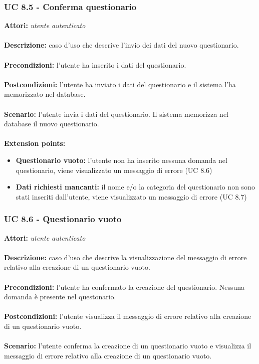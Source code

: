 \documentclass[a4paper,11pt]{article}
\begin{document}
\subsubsection{UC 8.5 - Conferma questionario}

\textbf{Attori:} \textit{utente autenticato}
\\ \\
\textbf{Descrizione:} caso d'uso che descrive l'invio dei dati del nuovo questionario.\\
\\
\textbf{Precondizioni:} l'utente ha inserito i dati del questionario.\\
\\
\textbf{Postcondizioni:} l’utente ha inviato i dati del questionario e il sistema l'ha memorizzato nel database.\\
\\
\textbf{Scenario:} l’utente invia i dati del questionario. Il sistema memorizza nel database il nuovo questionario.\\
\\
\textbf{Extension points:} 
\begin{itemize}
	\item \textbf{Questionario vuoto:} l'utente non ha inserito nessuna domanda nel questionario, viene visualizzato un messaggio di errore (UC 8.6)
	\item \textbf{Dati richiesti mancanti:} il nome e/o la categoria del questionario non sono stati inseriti dall'utente, viene visualizzato un messaggio di errore (UC 8.7)
\end{itemize}


\subsubsection{UC 8.6 - Questionario vuoto}

\textbf{Attori:} \textit{utente autenticato}
\\ \\
\textbf{Descrizione:} caso d'uso che descrive la visualizzazione del messaggio di errore relativo alla creazione di un questionario vuoto.\\
\\
\textbf{Precondizioni:} l'utente ha confermato la creazione del questionario. Nessuna domanda è presente nel questonario.\\
\\
\textbf{Postcondizioni:} l’utente visualizza il messaggio di errore relativo alla creazione di un questionario vuoto.\\
\\
\textbf{Scenario:} l'utente conferma la creazione di un questionario vuoto e visualizza il messaggio di errore relativo alla creazione di un questionario vuoto.\\
\end{document}
